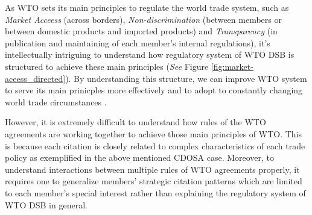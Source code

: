 As WTO sets its main principles to regulate the world trade system, 
such as \textit{Market Acceess} (across borders), 
\textit{Non-discrimination} (between members 
or between domestic products and imported products) 
and \textit{Transparency} (in publication and maintaining 
of each member's internal regulations), 
it's intellectually intriguing 
to understand how regulatory system of WTO DSB
is structured to achieve these main principles (\textit{See} Figure \ref{fig:market-aceess_directed}).
By understanding this structure, 
we can improve WTO system to serve its main prinicples more effectively 
and to adopt to constantly 
changing world trade circumstances
\citep{FREDEBEULKREIN1999625, shaffer_2004, 10.1093/jiel/jgm028}.

However, it is extremely difficult to 
understand how rules of the WTO agreements are
working together to achieve those main principles of WTO. 
This is because each citation is closely related 
to complex characteristics 
of each trade policy as exemplified in 
the above mentioned CDOSA case. 
Moreover, to understand interactions between multiple rules of WTO agreements properly, 
it requires one to generalize members' strategic 
citation patterns which are limited 
to each member's special interest 
rather than explaining the 
regulatory system of WTO DSB in general.


